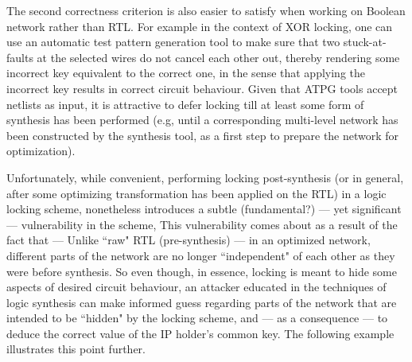 The second correctness criterion is also easier to satisfy when working on Boolean network rather than RTL. For example in the context of XOR locking, one can use an automatic test pattern generation tool to make sure that two stuck-at-faults at the selected wires do not cancel each other out, thereby rendering some incorrect key equivalent to the correct one, in the sense that applying the incorrect key results in correct circuit behaviour. Given that ATPG tools accept netlists as input, it is attractive to defer locking till at least some form of synthesis has been performed (e.g, until a corresponding multi-level network has been constructed by the synthesis tool, as a first step to prepare the network for optimization).


Unfortunately, while convenient, performing locking post-synthesis (or in general, after some optimizing transformation has been applied on the RTL) in a logic locking scheme, nonetheless introduces a subtle (fundamental?) --- yet significant --- vulnerability in the scheme, %
This vulnerability comes about as a result of the fact that --- Unlike ``raw" RTL (pre-synthesis) --- in an optimized network, different parts of the network are no longer ``independent" of each other as they were before synthesis. So even though, in essence, locking is meant to hide some aspects of desired circuit behaviour, an attacker educated in the techniques of logic synthesis
can make informed guess regarding parts of the network that are intended to be ``hidden" by the locking scheme, and --- as a consequence --- to deduce the correct value of the IP holder's common key. The following example illustrates this point further.

